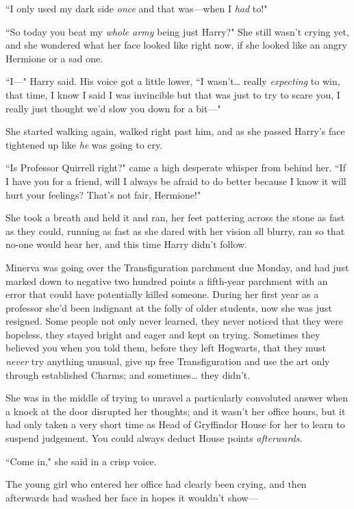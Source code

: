 ``I only used my dark side \emph{once} and that was—when I \emph{had} to!"

``So today you beat my \emph{whole army} being just Harry?" She still wasn't crying yet, and she wondered what her face looked like right now, if she looked like an angry Hermione or a sad one.

``I—" Harry said. His voice got a little lower, ``I wasn't{\ldots} really \emph{expecting} to win, that time, I know I said I was invincible but that was just to try to scare you, I really just thought we'd slow you down for a bit—"

She started walking again, walked right past him, and as she passed Harry's face tightened up like \emph{he} was going to cry.

``Is Professor Quirrell right?" came a high desperate whisper from behind her. ``If I have you for a friend, will I always be afraid to do better because I know it will hurt your feelings? That's not fair, Hermione!"

She took a breath and held it and ran, her feet pattering across the stone as fast as they could, running as fast as she dared with her vision all blurry, ran so that no-one would hear her, and this time Harry didn't follow.

\later

Minerva was going over the Transfiguration parchment due Monday, and had just marked down to negative two hundred points a fifth-year parchment with an error that could have potentially killed someone. During her first year as a professor she'd been indignant at the folly of older students, now she was just resigned. Some people not only never learned, they never noticed that they were hopeless, they stayed bright and eager and kept on trying. Sometimes they believed you when you told them, before they left Hogwarts, that they must \emph{never} try anything unusual, give up free Transfiguration and use the art only through established Charms; and sometimes{\ldots} they didn't.

She was in the middle of trying to unravel a particularly convoluted answer when a knock at the door disrupted her thoughts; and it wasn't her office hours, but it had only taken a very short time as Head of Gryffindor House for her to learn to suspend judgement. You could always deduct House points \emph{afterwards}.

``Come in," she said in a crisp voice.

The young girl who entered her office had clearly been crying, and then afterwards had washed her face in hopes it wouldn't show—

